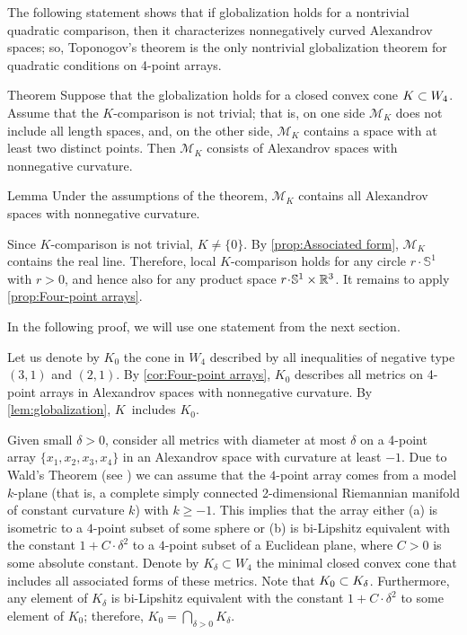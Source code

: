 \documentclass[a4paper,10pt]{article}
\begin{document}
The following statement shows that if globalization holds for a nontrivial quadratic comparison, then it characterizes nonnegatively curved Alexandrov spaces;
so, Toponogov's theorem is the only nontrivial globalization theorem for quadratic conditions on 4-point arrays.

\begin{thm}{Theorem}\label{thm:globalization}
Suppose that the globalization holds for a closed convex cone $K\z\subset W_4$.
Assume that the $K$-comparison is not trivial;
that is, on one side $\mathcal{M}_K$ does not include all length spaces, and, on the other side, $\mathcal{M}_K$ contains a space with at least two distinct points.
Then $\mathcal{M}_K$ consists of Alexandrov spaces with nonnegative curvature.
\end{thm}

\begin{thm}{Lemma}\label{lem:globalization}
Under the assumptions of the theorem, $\mathcal{M}_K$ contains all Alexandrov spaces with nonnegative curvature.
\end{thm}

Since $K$-comparison is not trivial, $K\ne\{0\}$.
By \ref{prop:Associated form}, $\mathcal{M}_K$ contains the real line.
Therefore, local $K$-comparison holds
for any circle $r\cdot \mathbb{S}^1$ with $r>0$, and hence also for any product space $r\cdot \mathbb{S}^1\times\RR^3$.
It remains to apply \ref{prop:Four-point arrays}.
\qeds

In the following proof, we will use one statement from the next section.

Let us denote by $K_0$ the cone in $W_4$ described by all inequalities of negative type $(3,1)$ and $(2,1)$.
By \ref{cor:Four-point arrays}, $K_0$ describes all metrics on 4-point arrays in Alexandrov spaces with nonnegative curvature.
By \ref{lem:globalization},  $K$~includes $K_0$.

Given small $\delta>0$, consider all metrics with diameter at most $\delta$ on a 4-point array $\{x_1,x_2,x_3,x_4\}$ in an Alexandrov space with curvature at least $-1$.
Due to Wald's Theorem (see \cite[Exercise 10.7]{AKP-2024}) we can assume that the $4$-point array
comes from a model $k$-plane (that is, a complete simply connected 2-dimensional Riemannian manifold of constant curvature $k$) with $k \ge -1$.
This implies that the array either (a) is isometric to a $4$-point subset of some sphere or (b) is bi-Lipshitz equivalent with the constant $1 + C\cdot \delta^2$ to a $4$-point subset of a Euclidean plane, where $C > 0$ is some absolute constant.
Denote by $K_\delta\subset W_4$ the minimal closed convex cone that includes all associated forms of these metrics.
Note that $K_0\z\subset K_\delta$.
Furthermore, 
any element of $K_\delta$ is bi-Lipshitz equivalent with the constant $1 + C \cdot\delta^2$ to some element of $K_0$;
therefore, $K_0=\bigcap_{\delta>0} K_\delta$.
\end{document}
